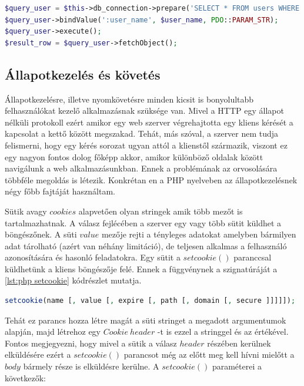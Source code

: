 \documentclass[12pt]{report}
\theoremstyle{definition}
\begin{document}
	\noindent\begin{minipage}{\linewidth}
		\begin{lstlisting}[language=php,label={lst:php pdo sql query}, caption={PHP PDO SQL lekérdezés}]
$query_user = $this->db_connection->prepare('SELECT * FROM users WHERE user_name = :user_name');
$query_user->bindValue(':user_name', $user_name, PDO::PARAM_STR);
$query_user->execute();
$result_row = $query_user->fetchObject();
		\end{lstlisting}
	\end{minipage}
	
	\subsection{Állapotkezelés és követés}
	Állapotkezelésre, illetve nyomkövetésre minden kicsit is bonyolultabb felhasználókat kezelő alkalmazásnak szüksége van. Mivel a HTTP egy állapot nélküli protokoll ezért amikor egy web szerver végrehajtotta egy kliens kérését a kapcsolat a kettő között megszakad. Tehát, más szóval, a szerver nem tudja felismerni, hogy egy kérés sorozat ugyan attól a klienstől származik, viszont ez egy nagyon fontos dolog főképp akkor, amikor különböző oldalak között navigálunk a web alkalmazásunkban. Ennek a problémának az orvosolására többféle megoldás is létezik. Konkrétan en a PHP nyelveben az állapotkezelésnek négy főbb fajtáját használtam. 
	
	Sütik avagy $cookies$ alapvetően olyan stringek amik több mezőt is tartalmazhatnak. A válasz fejlécében a szerver egy vagy több sütit küldhet a böngészőnek. A süti $value$ mezője rejti a tényleges adatokat amelyben bármilyen adat tárolható (azért van néhány limitáció), de teljesen alkalmas a felhasználó azonosítására és hasonló feladatokra. Egy sütit a $setcookie\left(\right)$ paranccsal küldhetünk a kliens böngészője felé. Ennek a függvénynek a szignatúráját a \ref{lst:php setcookie} kódrészlet mutatja.
	
	\noindent\begin{minipage}{\linewidth}
		\begin{lstlisting}[language=php,label={lst:php setcookie}, caption={PHP setcookie függvény}]
setcookie(name [, value [, expire [, path [, domain [, secure ]]]]]);
		\end{lstlisting}
	\end{minipage}
	
	Tehát ez parancs hozza létre magát a süti stringet a megadott argumentumok alapján, majd létrehoz egy $Cookie\ header$ -t is ezzel a stringgel és az értékével. Fontos megjegyezni, hogy mivel a sütik a válasz $header$ részében kerülnek elküldésére ezért a  $setcookie\left(\right)$ parancsot még az előtt meg kell hívni mielőtt a $body$ bármely része is elküldésre kerülne. A $setcookie\left(\right)$ paraméterei a következők:
	
\end{document}

